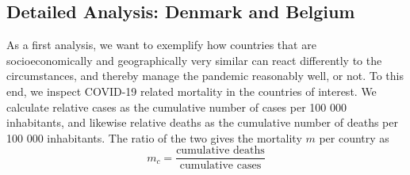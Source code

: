 \documentclass[a4paper,11pt]{article}
\begin{document}
\subsection*{Detailed Analysis: Denmark and Belgium}

As a first analysis, we want to exemplify how countries that are socioeconomically and geographically very similar can react differently to the circumstances, and thereby manage
the pandemic reasonably well, or not. To this end, we inspect COVID-19 related mortality in the countries of interest. We calculate relative cases as the cumulative number of cases per 100 000 inhabitants,
and likewise relative deaths as the cumulative number of deaths per 100 000 inhabitants. The ratio of the two gives the mortality $m$ per country as
\begin{equation}
    m_c = \frac{\text{cumulative deaths}}{\text{cumulative cases}}
\end{equation}
\end{document}
